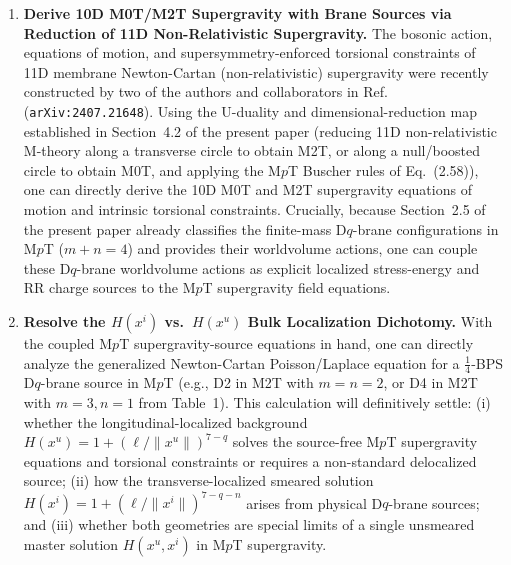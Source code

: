 \documentclass[11pt,a4paper]{article}
\begin{document}
\begin{enumerate}[label=\textbf{Step \arabic*:},leftmargin=4.2em]
    \item \textbf{Derive 10D M0T/M2T Supergravity with Brane Sources via Reduction of 11D Non-Relativistic Supergravity.}
    The bosonic action, equations of motion, and supersymmetry-enforced torsional constraints of 11D membrane Newton-Cartan (non-relativistic) supergravity were recently constructed by two of the authors and collaborators in Ref.~\cite{Bergshoeff:2024nin} (\texttt{arXiv:2407.21648}). Using the U-duality and dimensional-reduction map established in Section~4.2 of the present paper (reducing 11D non-relativistic M-theory along a transverse circle to obtain M2T, or along a null/boosted circle to obtain M0T, and applying the M$p$T Buscher rules of Eq.~(2.58)), one can directly derive the 10D M0T and M2T supergravity equations of motion and intrinsic torsional constraints. Crucially, because Section~2.5 of the present paper already classifies the finite-mass D$q$-brane configurations in M$p$T ($m+n=4$) and provides their worldvolume actions, one can couple these D$q$-brane worldvolume actions as explicit localized stress-energy and RR charge sources to the M$p$T supergravity field equations.

    \item \textbf{Resolve the $H(x^i)$ vs.\ $H(x^u)$ Bulk Localization Dichotomy.}
    With the coupled M$p$T supergravity-source equations in hand, one can directly analyze the generalized Newton-Cartan Poisson/Laplace equation for a $\tfrac{1}{4}$-BPS D$q$-brane source in M$p$T (e.g., D2 in M2T with $m=n=2$, or D4 in M2T with $m=3, n=1$ from Table~1). This calculation will definitively settle: (i) whether the longitudinal-localized background $H(x^u) = 1 + (\ell/\|x^u\|)^{7-q}$ solves the source-free M$p$T supergravity equations and torsional constraints or requires a non-standard delocalized source; (ii) how the transverse-localized smeared solution $H(x^i) = 1 + (\boldsymbol{\ell}/\|x^i\|)^{7-q-n}$ arises from physical D$q$-brane sources; and (iii) whether both geometries are special limits of a single unsmeared master solution $H(x^u, x^i)$ in M$p$T supergravity.


\end{enumerate}
\end{document}
